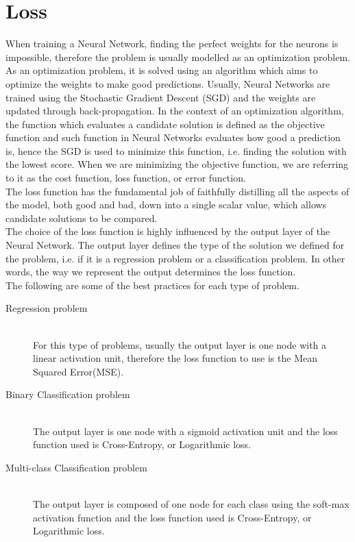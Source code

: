 \section{Loss}
When training a Neural Network, finding the perfect weights for the neurons is impossible, therefore the problem is usually modelled as an optimization problem. As an optimization problem, it is solved using an algorithm which aims to optimize the weights to make good predictions. Usually, Neural Networks are trained using the Stochastic Gradient Descent (SGD) and the weights are updated through back-propagation. In the context of an optimization algorithm, the function which evaluates a candidate solution is defined as the objective function and such function in Neural Networks evaluates how good a prediction is, hence the SGD is used to minimize this function, i.e. finding the solution with the lowest score. 
When we are minimizing the objective function, we are referring to it as the cost function, loss function, or error function. \cite{Goodfellow-et-al-2016}\\
The loss function has the fundamental job of faithfully distilling all the aspects of the model, both good and bad, down into a single scalar value, which allows candidate solutions to be compared. \cite{reed_neural_1999}\\
The choice of the loss function is highly influenced by the output layer of the Neural Network. The output layer defines the type of the solution we defined for the problem, i.e. if it is a regression problem or a classification problem. In other words, the way we  represent the output determines the loss function. \cite{Goodfellow-et-al-2016}\\
The following are some of the best practices for each type of problem. 
\\\hfill
\begin{description}
  \item[Regression problem] \hfill\\ 
  For this type of problems, usually the output layer is one node with a linear activation unit, therefore the loss function to use is the Mean Squared Error(MSE). 
  \item[Binary Classification problem] \hfill\\ 
  The output layer is one node with a sigmoid activation unit and the loss function used is Cross-Entropy, or Logarithmic loss. 
  \item[Multi-class Classification problem] \hfill\\ 
  The output layer is composed of one node for each class using the soft-max activation function and the loss function used is Cross-Entropy, or Logarithmic loss. 
\end{description}


